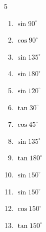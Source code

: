 \begin{multicols}{5}
\begin{enumerate}
\resetques

  \item $\displaystyle \sin{90^\circ}$

        \phantom{$\displaystyle =1$}

  \item $\displaystyle \cos{90^\circ}$

        \phantom{$\displaystyle =0$}

  \item $\displaystyle \sin{135^\circ}$


  \item $\displaystyle \sin{180^\circ}$

        \phantom{$\displaystyle =0$}

  \item $\displaystyle \sin{120^\circ}$


  \item $\displaystyle \tan{30^\circ}$


  \item $\displaystyle \cos{45^\circ}$


  \item $\displaystyle \sin{135^\circ}$


  \item $\displaystyle \tan{180^\circ}$

        \phantom{$\displaystyle =0$}

  \item $\displaystyle \sin{150^\circ}$


  \item $\displaystyle \sin{150^\circ}$


  \item $\displaystyle \cos{150^\circ}$


  \item $\displaystyle \tan{150^\circ}$


\end{enumerate}
\end{multicols}
